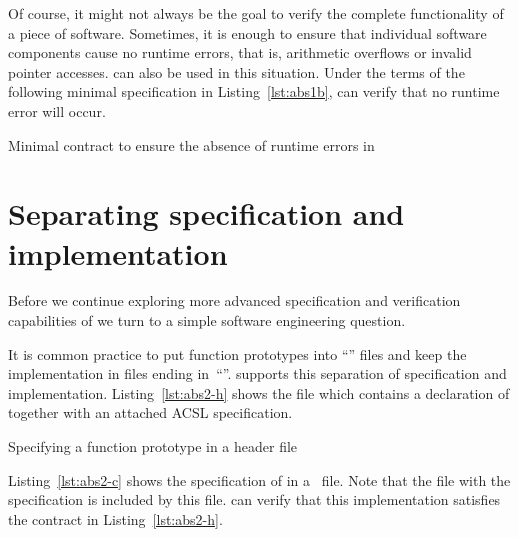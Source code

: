 
Of course, it might not always be the goal to verify the complete functionality of a
piece of software.
Sometimes, it is enough to ensure that individual software components
cause no runtime errors, that is, arithmetic overflows or invalid pointer accesses.
\framacwp can also be used in this situation.
Under the terms of the following minimal specification in 
Listing~\ref{lst:abs1b}, \framacwp can verify that no runtime error will occur.

\begin{listing}[hbt]
\begin{minipage}{\textwidth}

\end{minipage}
\caption{\label{lst:abs1b} Minimal contract to ensure the absence of runtime errors in }
\end{listing}


\section{Separating specification and implementation}
\label{sec:separating-spec-impl}

Before we continue exploring more advanced specification and verification
capabilities of \framacwp we turn to a simple software engineering question.

It is common practice to put function prototypes into ``'' files and
keep the implementation in files ending in~``''.
\framacwp supports this separation of specification and implementation.
Listing~\ref{lst:abs2-h} shows the file  which contains
a declaration of  together with an attached ACSL specification.

\begin{listing}[hbt]
\begin{minipage}{\textwidth}

\end{minipage}
\caption{\label{lst:abs2-h} Specifying a function prototype in a header file}
\end{listing}

Listing~\ref{lst:abs2-c} shows the specification of  in a~ file.
Note that the file  with the specification is included by this file.
\framacwp can verify that this implementation satisfies the contract in
Listing~\ref{lst:abs2-h}.




